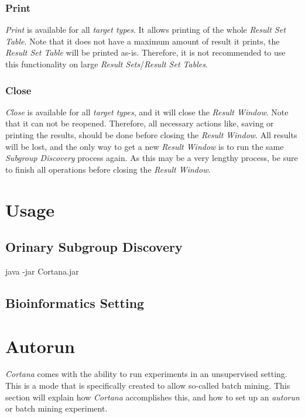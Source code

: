 \documentclass{article}
\begin{document}
\subsubsection{Print}
\label{result-window:print}
\emph{Print} is available for all \emph{target types}.
It allows printing of the whole \emph{Result Set Table}.
Note that it does not have a maximum amount of result it prints, the \emph{Result Set Table} will be printed as-is.
Therefore, it is not recommended to use this functionality on large \emph{Result Sets}/\emph{Result Set Tables}.



\subsubsection{Close}
\label{result-window:close}
\emph{Close} is available for all \emph{target types}, and it will close the \emph{Result Window}.
Note that it can not be reopened.
Therefore, all necessary actions like, saving or printing the results, should be done before closing the \emph{Result Window}.
All results will be lost, and the only way to get a new \emph{Result Window} is to run the same \emph{Subgroup Discovery} process again.
As this may be a very lengthy process, be sure to finish all operations before closing the \emph{Result Window}.





\section{Usage}
\label{section:usage}



\subsection{Orinary Subgroup Discovery}
\label{usage:normal}
java -jar Cortana.jar



\subsection{Bioinformatics Setting}
\label{usage:bioinformatics}





\section{Autorun}
\label{section:auto-run}
\emph{Cortana} comes with the ability to run experiments in an unsupervised setting.
This is a mode that is specifically created to allow so-called batch mining.
This section will explain how \emph{Cortana} accomplishes this, and how to set up an \emph{autorun} or batch mining experiment.
\end{document}
